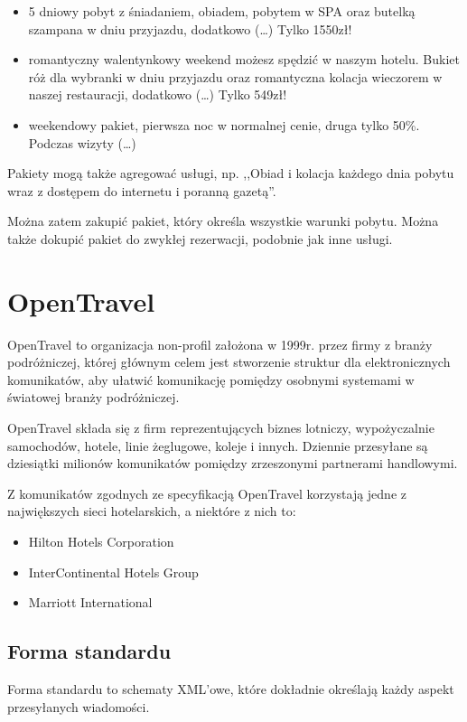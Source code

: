 \documentclass[a4paper,onecolumn,oneside,11pt,wide,floatssmall]{mwrep}
\theoremstyle{definition}
\theoremstyle{plain}%
\theoremstyle{remark}
\begin{document}
\begin{itemize}
 \item 5 dniowy pobyt z śniadaniem, obiadem, pobytem w SPA oraz butelką 
 szampana w dniu przyjazdu, dodatkowo (\dots) Tylko 1550zł!
 \item romantyczny walentynkowy weekend możesz spędzić w naszym hotelu. 
 Bukiet róż dla wybranki w dniu przyjazdu oraz romantyczna kolacja wieczorem 
 w naszej restauracji, dodatkowo (\dots) Tylko 549zł!
 \item weekendowy pakiet, pierwsza noc w normalnej cenie, druga tylko 50\%. 
 Podczas wizyty (\dots)
\end{itemize}

Pakiety mogą także agregować usługi, np. ,,Obiad i kolacja każdego dnia 
pobytu wraz z dostępem do internetu i poranną gazetą''. 

Można zatem zakupić pakiet, który określa wszystkie warunki pobytu. Można 
także dokupić pakiet do zwykłej rezerwacji, podobnie jak inne usługi.

\section{OpenTravel}
OpenTravel to organizacja non-profil założona w \mbox{1999r.} przez firmy z 
branży podróżniczej, której głównym celem jest stworzenie struktur dla 
elektronicznych komunikatów, aby ułatwić komunikację pomiędzy osobnymi 
systemami w światowej branży podróżniczej.

OpenTravel składa się z firm reprezentujących biznes lotniczy, wypożyczalnie 
samochodów, hotele, linie żeglugowe, koleje i innych. Dziennie przesyłane są 
dziesiątki milionów komunikatów pomiędzy zrzeszonymi partnerami handlowymi.

Z komunikatów zgodnych ze specyfikacją OpenTravel korzystają jedne z największych sieci hotelarskich, a niektóre z nich to:
\begin{itemize}
  \item Hilton Hotels Corporation
  \item InterContinental Hotels Group
  \item Marriott International
\end{itemize}

\subsection{Forma standardu}
Forma standardu to schematy XML'owe, które dokładnie określają każdy aspekt 
przesyłanych wiadomości.
\end{document}
